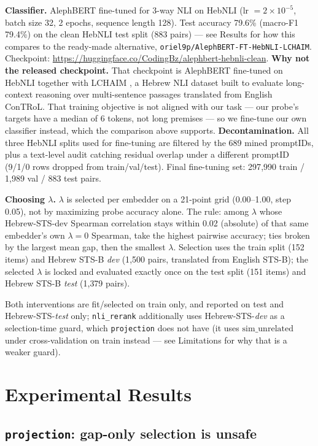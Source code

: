 \documentclass{article}
\begin{document}
\textbf{Classifier.} AlephBERT fine-tuned for 3-way NLI on HebNLI
(lr $=2\times10^{-5}$, batch size 32, 2 epochs, sequence length 128).
Test accuracy 79.6\% (macro-F1 79.4\%) on the clean HebNLI test split (883
pairs) --- see Results for how this compares to the ready-made alternative,
\texttt{oriel9p/AlephBERT-FT-HebNLI-LCHAIM}. Checkpoint:
\url{https://huggingface.co/CodingBz/alephbert-hebnli-clean}.
\textbf{Why not the released checkpoint.}
That checkpoint is AlephBERT fine-tuned on HebNLI together with LCHAIM
\citep{malul2025lchaim}, a Hebrew NLI dataset built to evaluate
long-context reasoning over multi-sentence passages translated from
English ConTRoL. That training objective is not aligned with our task ---
our probe's targets have a median of 6 tokens, not long premises --- so we
fine-tune our own classifier instead, which the comparison above supports.
\textbf{Decontamination.} All three HebNLI splits used for
fine-tuning are filtered by the 689 mined promptIDs, plus a text-level
audit catching residual overlap under a different promptID (9/1/0 rows
dropped from train/val/test). Final fine-tuning set: 297{,}990 train /
1{,}989 val / 883 test pairs.

\textbf{Choosing $\lambda$.} $\lambda$ is selected per embedder on a
21-point grid (0.00--1.00, step 0.05), not by maximizing probe accuracy
alone. The rule: among $\lambda$ whose Hebrew-STS-dev Spearman correlation
stays within 0.02 (absolute) of that same embedder's own $\lambda=0$
Spearman, take the highest pairwise accuracy; ties broken by the largest
mean gap, then the smallest $\lambda$. Selection uses the train split (152
items) and Hebrew STS-B \emph{dev} (1{,}500 pairs, translated from English
STS-B); the selected $\lambda$ is locked and evaluated exactly once on the
test split (151 items) and Hebrew STS-B \emph{test} (1{,}379 pairs).

Both interventions are fit/selected on train only, and reported on test and
Hebrew-STS-\emph{test} only; \texttt{nli\_rerank} additionally uses
Hebrew-STS-\emph{dev} as a selection-time guard, which \texttt{projection}
does not have (it uses $\mathrm{sim\_unrelated}$ under cross-validation on
train instead --- see Limitations for why that is a weaker guard).

\section{Experimental Results}
\label{sec:results}

\subsection{\texttt{projection}: gap-only selection is unsafe}
\end{document}
